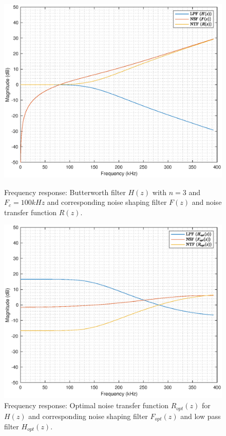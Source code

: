 \documentclass[a4paper]{article}
\begin{document}
\begin{figure}[!h]
	\centering
	\begin{minipage}{0.45\linewidth}
		\centering
		\includegraphics[scale = 0.45]{mat_plots/NO_butter_3_100khz_1Mhz_27_06_2024.eps}
		\caption{Frequency response: Butterworth filter $H(z)$ with $n = 3$ and $F_{c} = 100\mathit{kHz}$ and corresponding noise shaping filter $F(z)$ and noise transfer function $R(z)$.}
        \label{fig:nonoptimal_filter}
	\end{minipage}
	\hfil
	\begin{minipage}{0.45\linewidth}
		\centering
		\includegraphics[scale = 0.45]{mat_plots/O_butter_3_100khz_1Mhz_27_06_2024.eps}
		\caption{Frequency response: Optimal noise transfer function $R_{opt}(z)$ for $H(z)$ and corresponding noise shaping filter $F_{opt}(z)$ and low pass filter $H_{opt}(z)$.}
   \label{fig:optimal_filter}
	\end{minipage}
\end{figure}
\end{document}
